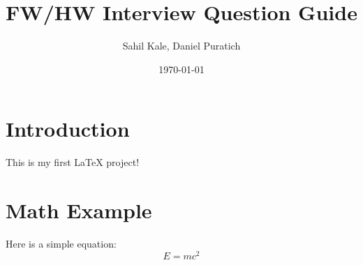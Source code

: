 \documentclass[letterpaper,12pt]{article}
\title{FW/HW Interview Question Guide}
\author{Sahil Kale, Daniel Puratich}
\date{\today}
\begin{document}
\maketitle

\section{Introduction}
This is my first LaTeX project!

\section{Math Example}
Here is a simple equation:
\begin{equation}
   E = mc^2
\end{equation}
\end{document}
